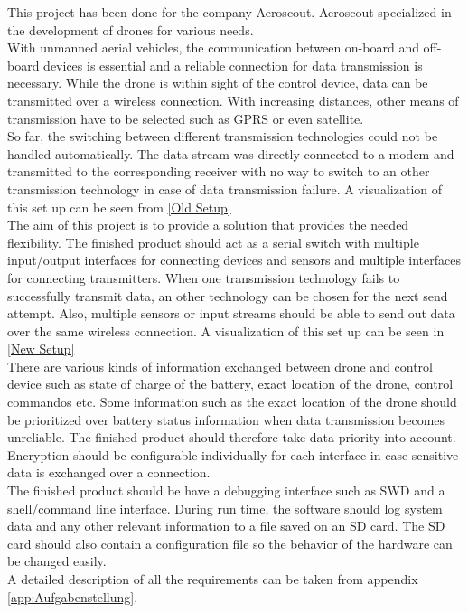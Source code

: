 %
\label{sec:txtAufgabenstellung}
This project has been done for the company Aeroscout. Aeroscout specialized in the development of drones for various needs. \\
With unmanned aerial vehicles, the communication between on-board and off-board devices is essential and a reliable connection for data transmission is necessary. While the drone is within sight of the control device, data can be transmitted over a wireless connection. With increasing distances, other means of transmission have to be selected such as GPRS or even satellite.\\
So far, the switching between different transmission technologies could not be handled automatically. The data stream was directly connected to a modem and transmitted to the corresponding receiver with no way to switch to an other transmission technology in case of data transmission failure. A visualization of this set up can be seen from \autoref{Old Setup}\\
%
The aim of this project is to provide a solution that provides the needed flexibility. The finished product should act as a serial switch with multiple input/output interfaces for connecting devices and sensors and multiple interfaces for connecting transmitters. When one transmission technology fails to successfully transmit data, an other technology can be chosen for the next send attempt. Also, multiple sensors or input streams should be able to send out data over the same wireless connection. A visualization of this set up can be seen in \autoref{New Setup}\\
%
There are various kinds of information exchanged between drone and control device such as state of charge of the battery, exact location of the drone, control commandos etc. Some information such as the exact location of the drone should be prioritized over battery status information when data transmission becomes unreliable. The finished product should therefore take data priority into account. \\
Encryption should be configurable individually for each interface in case sensitive data is exchanged over a connection. \\
The finished product should be have a debugging interface such as SWD and a shell/command line interface. During run time, the software should log system data and any other relevant information to a file saved on an SD card. The SD card should also contain a configuration file so the behavior of the hardware can be changed easily. \\
A detailed description of all the requirements can be taken from appendix \autoref{app:Aufgabenstellung}.